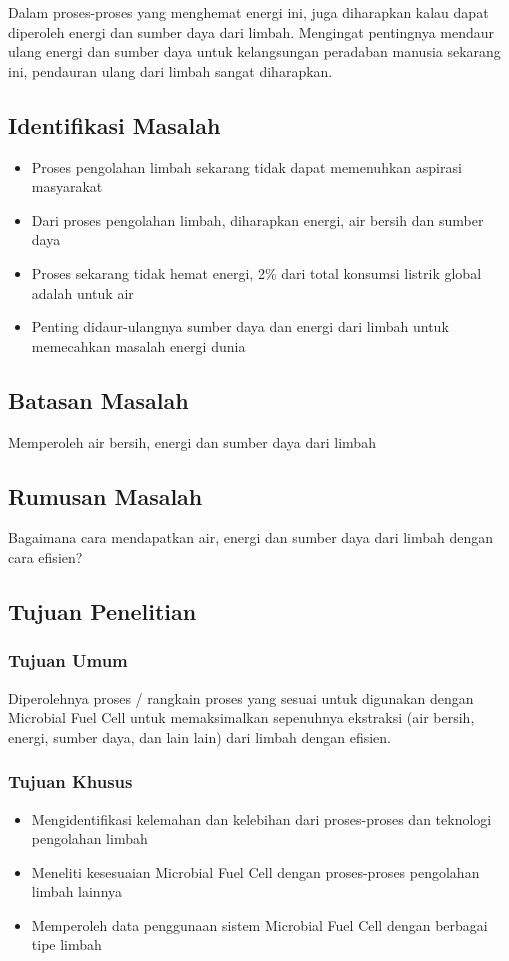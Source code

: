 \documentclass[10pt,a4paper,hidelinks]{article}
\begin{document}
    Dalam proses-proses yang menghemat energi ini, juga diharapkan kalau dapat diperoleh energi dan sumber daya dari limbah. Mengingat pentingnya mendaur ulang energi dan sumber daya untuk kelangsungan peradaban manusia sekarang ini, pendauran ulang dari limbah sangat diharapkan.
    
	\subsection{Identifikasi Masalah}
	\begin{itemize}
	\item Proses pengolahan limbah sekarang tidak dapat memenuhkan aspirasi masyarakat
	\item Dari proses pengolahan limbah, diharapkan energi, air bersih dan sumber daya
	\item Proses sekarang tidak hemat energi, 2\% dari total konsumsi listrik global adalah untuk air
	\item Penting didaur-ulangnya sumber daya dan energi dari limbah untuk memecahkan masalah energi dunia
	\end{itemize}
	\subsection{Batasan Masalah}
	Memperoleh air bersih, energi dan sumber daya dari limbah
	\subsection{Rumusan Masalah}
	Bagaimana cara  mendapatkan air, energi dan sumber daya dari limbah dengan cara efisien?
	\subsection{Tujuan Penelitian}
	\subsubsection{Tujuan Umum}
	Diperolehnya proses / rangkain proses yang sesuai untuk digunakan dengan Microbial Fuel Cell untuk memaksimalkan sepenuhnya ekstraksi (air bersih, energi, sumber daya, dan lain lain) dari limbah dengan efisien.
	\subsubsection{Tujuan Khusus}
	\begin{itemize}
	\item Mengidentifikasi kelemahan dan kelebihan dari proses-proses dan teknologi pengolahan limbah
	\item Meneliti kesesuaian Microbial Fuel Cell dengan proses-proses pengolahan limbah lainnya
	\item Memperoleh data penggunaan sistem Microbial Fuel Cell dengan berbagai tipe limbah
	\end{itemize}
\end{document}
